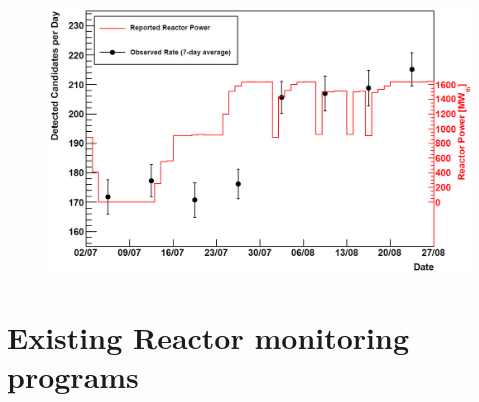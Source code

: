 \begin{figure}[htbp]
 \centering
 \includegraphics[width=0.90\linewidth]{Chapter2/Figs/Raster/prototypeMeasureOnFig.png} 
 \label{fig:prototypeMeasumentFlux}
\end{figure}

\section{Existing Reactor monitoring programs}
